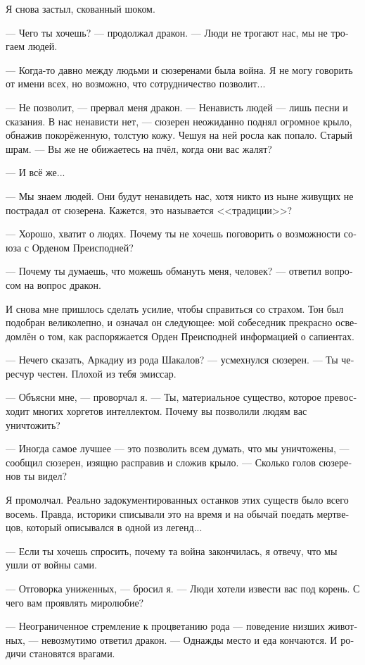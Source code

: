 \documentclass[a4paper,12pt,fleqn]{book}\usepackage{polyglossia}\setdefaultlanguage[babelshorthands=true]{russian}\setotherlanguage{english}\defaultfontfeatures{Ligatures=TeX,Mapping=tex-text}\usepackage{xcolor}\newcommand{\ml}[3]{#2}
\begin{document}
Я снова застыл, скованный шоком.

--- Чего ты хочешь? --- продолжал дракон.
--- Люди не трогают нас, мы не трогаем людей.

--- Когда-то давно между людьми и сюзеренами была война.
Я не могу говорить от имени всех, но возможно, что сотрудничество позволит...

--- Не позволит, --- прервал меня дракон.
--- Ненависть людей --- лишь песни и сказания.
В нас ненависти нет, --- сюзерен неожиданно поднял огромное крыло, обнажив покорёженную, толстую кожу.
Чешуя на ней росла как попало.
Старый шрам.
--- Вы же не обижаетесь на пчёл, когда они вас жалят?

--- И всё же...

--- Мы знаем людей.
Они будут ненавидеть нас, хотя никто из ныне живущих не пострадал от сюзерена.
Кажется, это называется <<традиции>>?

--- Хорошо, хватит о людях.
Почему ты не хочешь поговорить о возможности союза с Орденом Преисподней?

--- Почему ты думаешь, что можешь обмануть меня, человек? --- ответил вопросом на вопрос дракон.

И снова мне пришлось сделать усилие, чтобы справиться со страхом.
Тон был подобран великолепно, и означал он следующее: мой собеседник прекрасно осведомлён о том, как распоряжается Орден Преисподней информацией о сапиентах.

--- Нечего сказать, Аркадиу из рода Шакалов? --- усмехнулся сюзерен.
--- Ты чересчур честен.
Плохой из тебя эмиссар.

--- Объясни мне, --- проворчал я.
--- Ты, материальное существо, которое превосходит многих хоргетов интеллектом.
Почему вы позволили людям вас уничтожить?

--- Иногда самое лучшее --- это позволить всем думать, что мы уничтожены, --- сообщил сюзерен, изящно расправив и сложив крыло.
--- Сколько голов сюзеренов ты видел?

Я промолчал.
Реально задокументированных останков этих существ было всего восемь.
Правда, историки списывали это на время и на обычай поедать мертвецов, который описывался в одной из легенд...

--- Если ты хочешь спросить, почему та война закончилась, я отвечу, что мы ушли от войны сами.

--- Отговорка униженных, --- бросил я.
--- Люди хотели извести вас под корень.
С чего вам проявлять миролюбие?

--- Неограниченное стремление к процветанию рода --- поведение низших животных, --- невозмутимо ответил дракон.
--- Однажды место и еда кончаются.
И родичи становятся врагами.
\end{document}

